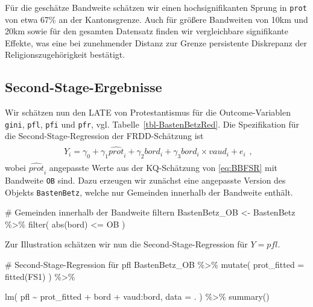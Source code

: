 \documentclass[
  a4paper,
  DIV=11,
  oneside]{scrreprt}
\newenvironment{Shaded}{\begin{snugshade}}{\end{snugshade}}
\newcommand{\AttributeTok}[1]{\textcolor[rgb]{0.40,0.45,0.13}{#1}}
\newcommand{\CommentTok}[1]{\textcolor[rgb]{0.37,0.37,0.37}{#1}}
\newcommand{\FunctionTok}[1]{\textcolor[rgb]{0.28,0.35,0.67}{#1}}
\newcommand{\NormalTok}[1]{\textcolor[rgb]{0.00,0.23,0.31}{#1}}
\newcommand{\OtherTok}[1]{\textcolor[rgb]{0.00,0.23,0.31}{#1}}
\newcommand{\SpecialCharTok}[1]{\textcolor[rgb]{0.37,0.37,0.37}{#1}}
\begin{document}
Für die geschätze Bandweite schätzen wir einen hochsignifikanten Sprung
in \texttt{prot} von etwa 67\% an der Kantonsgrenze. Auch für größere
Bandweiten von 10km und 20km sowie für den gesamten Datensatz finden wir
vergleichbare signifikante Effekte, was eine bei zunehmender Distanz zur
Grenze persistente Diskrepanz der Religionszugehörigkeit bestätigt.

\hypertarget{second-stage-ergebnisse}{%
\subsection{Second-Stage-Ergebnisse}\label{second-stage-ergebnisse}}

Wir schätzen nun den LATE von Protestantismus für die Outcome-Variablen
\texttt{gini}, \texttt{pfl}, \texttt{pfi} und \texttt{pfr}, vgl.
Tabelle~\ref{tbl-BastenBetzRed}. Die Spezifikation für die
Second-Stage-Regression der FRDD-Schätzung ist \begin{align}
  \begin{split}
    Y_i = \gamma_0 + \gamma_1 \widehat{prot}_i +  \gamma_2 bord_i + \gamma_3 bord_i  \times vaud_i + e_i
  \end{split},
\end{align} wobei \(\widehat{prot}_i\) angepasste Werte aus der
KQ-Schätzung von \eqref{eq:BBFSR} mit Bandweite \texttt{OB} sind. Dazu
erzeugen wir zunächst eine angepasste Version des Objekts
\texttt{BastenBetz}, welche nur Gemeinden innerhalb der Bandweite
enthält.

\begin{Shaded}
\begin{Highlighting}[]
\CommentTok{\# Gemeinden innerhalb der Bandweite filtern}
\NormalTok{BastenBetz\_OB }\OtherTok{\textless{}{-}}\NormalTok{ BastenBetz }\SpecialCharTok{\%\textgreater{}\%} 
  \FunctionTok{filter}\NormalTok{(}
    \FunctionTok{abs}\NormalTok{(bord) }\SpecialCharTok{\textless{}=}\NormalTok{ OB}
\NormalTok{  )}
\end{Highlighting}
\end{Shaded}

Zur Illustration schätzen wir nun die Second-Stage-Regression für
\(Y = pfl\).

\begin{Shaded}
\begin{Highlighting}[]
\CommentTok{\# Second{-}Stage{-}Regression für \textasciigrave{}pfl\textasciigrave{}}
\NormalTok{BastenBetz\_OB }\SpecialCharTok{\%\textgreater{}\%} 
  \FunctionTok{mutate}\NormalTok{(}
    \AttributeTok{prot\_fitted =} \FunctionTok{fitted}\NormalTok{(FS1)}
\NormalTok{    ) }\SpecialCharTok{\%\textgreater{}\%}

\FunctionTok{lm}\NormalTok{(}
\NormalTok{  pfl }\SpecialCharTok{\textasciitilde{}}\NormalTok{ prot\_fitted }\SpecialCharTok{+}\NormalTok{ bord }\SpecialCharTok{+}\NormalTok{ vaud}\SpecialCharTok{:}\NormalTok{bord, }
  \AttributeTok{data =}\NormalTok{ .}
\NormalTok{) }\SpecialCharTok{\%\textgreater{}\%} 
  \FunctionTok{summary}\NormalTok{()}
\end{Highlighting}
\end{Shaded}
\end{document}
